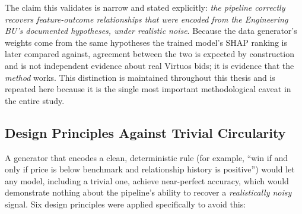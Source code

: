 \documentclass[12pt,oneside]{report}
\begin{document}
The claim this validates is narrow and stated explicitly: \emph{the
pipeline correctly recovers feature-outcome relationships that were
encoded from the Engineering BU's documented hypotheses, under realistic
noise}. Because the data generator's weights come from the same
hypotheses the trained model's SHAP ranking is later compared against,
agreement between the two is expected by construction and is not
independent evidence about real Virtuos bids; it is evidence that the
\emph{method} works. This distinction is maintained throughout this
thesis and is repeated here because it is the single most important
methodological caveat in the entire study.

\hypertarget{design-principles-against-trivial-circularity}{%
\subsection{Design Principles Against Trivial
Circularity}\label{design-principles-against-trivial-circularity}}

A generator that encodes a clean, deterministic rule (for example, ``win
if and only if price is below benchmark and relationship history is
positive'') would let any model, including a trivial one, achieve
near-perfect accuracy, which would demonstrate nothing about the
pipeline's ability to recover a \emph{realistically noisy} signal. Six
design principles were applied specifically to avoid this:
\end{document}

